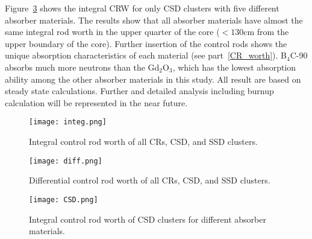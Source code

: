 Figure~\ref{fig:CSD} shows the integral CRW for only CSD clusters with five 
different absorber materials. The results show that all absorber materials 
have almost the same integral rod worth in the upper quarter of the core 
($<130$cm from the upper boundary of the core). Further insertion of the 
control rods shows the unique absorption characteristics of each material (see 
part~\ref{CR_worth}). B$_4$C-90 absorbs much more neutrons than the 
Gd$_2$O$_3$, which has the lowest absorption ability among the other absorber 
materials in this study. All result are based on steady state calculations. 
Further and detailed analysis including burnup calculation will be represented 
in the near future.
\begin{figure}
	\centering
	\texttt{[image: integ.png]}
	\vspace{-0.5in}
	\caption{Integral control rod worth of all CRs, CSD, and SSD clusters.} 
	\label{fig:integ}
\end{figure}
\begin{figure}
	\centering
	\texttt{[image: diff.png]}
	\vspace{-0.5in}
	\caption{Differential control rod worth of all CRs, CSD, and SSD clusters.} 
	\label{fig:diff}
\end{figure}
\begin{figure}
	\centering
	\texttt{[image: CSD.png]}
	\vspace{-0.5in}
	\caption{Integral control rod worth of CSD clusters for different absorber materials.} 
	\label{fig:CSD}
\end{figure}